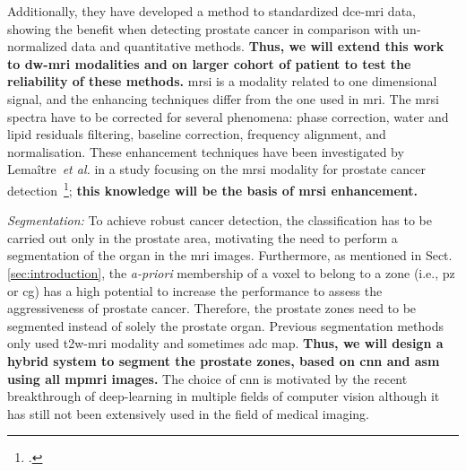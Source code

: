 Additionally, they have developed a method to standardized \ac{dce}-\ac{mri} data, showing the benefit when detecting prostate cancer in comparison with un-normalized data and quantitative methods.
\textbf{Thus, we will extend this work to \ac{dw}-\ac{mri} modalities and on larger cohort of patient to test the reliability of these methods.}
\ac{mrsi} is a modality related to one dimensional signal, and the enhancing techniques differ from the one used in \ac{mri}.
The \ac{mrsi} spectra have to be corrected for several phenomena: phase correction, water and lipid residuals filtering, baseline correction, frequency alignment, and normalisation.
These enhancement techniques have been investigated by Lema\^itre~\emph{et al.} in a study focusing on the \ac{mrsi} modality for prostate cancer detection~\footcite{Lemaitre2011}; \textbf{this knowledge will be the basis of \ac{mrsi} enhancement.}

\emph{Segmentation:}
To achieve robust cancer detection, the classification has to be carried out only in the prostate area, motivating the need to perform a segmentation of the organ in the \ac{mri} images.
Furthermore, as mentioned in Sect.\,\ref{sec:introduction}, the \emph{a-priori} membership of a voxel to belong to a zone (i.e., \ac{pz} or \ac{cg}) has a high potential to increase the performance to assess the aggressiveness of prostate cancer.
Therefore, the prostate zones need to be segmented instead of solely the prostate organ.
Previous segmentation methods only used \ac{t2w}-\ac{mri} modality and sometimes \ac{adc} map.
\textbf{Thus, we will design a hybrid system to segment the prostate zones, based on \ac{cnn} and \ac{asm} using all \ac{mpmri} images.}
The choice of \ac{cnn} is motivated by the recent breakthrough of deep-learning in multiple fields of computer vision although it has still not been extensively used in the field of medical imaging.

